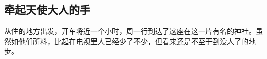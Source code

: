 \subsection{牵起天使大人的手}

从住的地方出发，开车将近一个小时，周一行到达了这座在这一片有名的神社。虽然如他们所料，比起在电视里人已经少了不少，但看来还是不至于到没人了的地步。\\



























